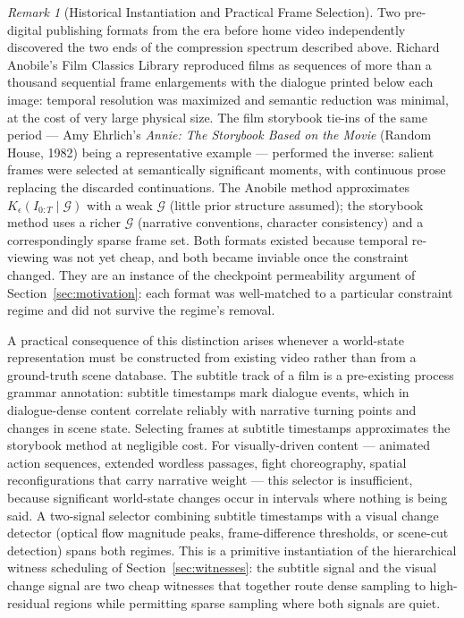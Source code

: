 \documentclass[11pt,a4paper]{article}
\theoremstyle{plain}
\theoremstyle{definition}
\theoremstyle{remark}
\newtheorem{remark}[theorem]{Remark}
\begin{document}
\begin{remark}[Historical Instantiation and Practical Frame Selection]
Two pre-digital publishing formats from the era before home video independently discovered the two ends of the compression spectrum described above. Richard Anobile's Film Classics Library reproduced films as sequences of more than a thousand sequential frame enlargements with the dialogue printed below each image: temporal resolution was maximized and semantic reduction was minimal, at the cost of very large physical size. The film storybook tie-ins of the same period --- Amy Ehrlich's \textit{Annie: The Storybook Based on the Movie} (Random House, 1982) being a representative example --- performed the inverse: salient frames were selected at semantically significant moments, with continuous prose replacing the discarded continuations. The Anobile method approximates $K_\epsilon(I_{0:T} \mid \mathcal{G})$ with a weak $\mathcal{G}$ (little prior structure assumed); the storybook method uses a richer $\mathcal{G}$ (narrative conventions, character consistency) and a correspondingly sparse frame set. Both formats existed because temporal re-viewing was not yet cheap, and both became inviable once the constraint changed. They are an instance of the checkpoint permeability argument of Section~\ref{sec:motivation}: each format was well-matched to a particular constraint regime and did not survive the regime's removal.

A practical consequence of this distinction arises whenever a world-state representation must be constructed from existing video rather than from a ground-truth scene database. The subtitle track of a film is a pre-existing process grammar annotation: subtitle timestamps mark dialogue events, which in dialogue-dense content correlate reliably with narrative turning points and changes in scene state. Selecting frames at subtitle timestamps approximates the storybook method at negligible cost. For visually-driven content --- animated action sequences, extended wordless passages, fight choreography, spatial reconfigurations that carry narrative weight --- this selector is insufficient, because significant world-state changes occur in intervals where nothing is being said. A two-signal selector combining subtitle timestamps with a visual change detector (optical flow magnitude peaks, frame-difference thresholds, or scene-cut detection) spans both regimes. This is a primitive instantiation of the hierarchical witness scheduling of Section~\ref{sec:witnesses}: the subtitle signal and the visual change signal are two cheap witnesses that together route dense sampling to high-residual regions while permitting sparse sampling where both signals are quiet.
\end{remark}
\end{document}
